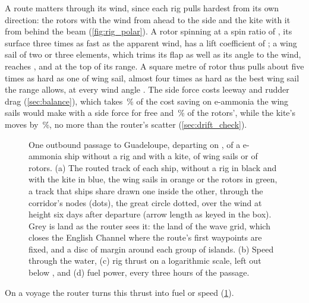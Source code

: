 A route matters through its wind, since each rig pulls hardest from its own direction: the rotors with the wind from ahead to the side and the kite with it from behind the beam (\cref{fig:rig_polar}). A rotor spinning at a spin ratio of , its surface three times as fast as the apparent wind, has a lift coefficient of ; a wing sail of two or three elements, which trims its flap as well as its angle to the wind, reaches , and  at the top of its range. A square metre of rotor thus pulls about five times as hard as one of wing sail, almost four times as hard as the best wing sail the range allows, at every wind angle . The side force costs leeway and rudder drag (\cref{sec:balance}), which takes \NumSideForceWings\,\% of the cost saving on e-ammonia the wing sails would make with a side force for free and \NumSideForceRotors\,\% of the rotors', while the kite's moves by \NumSideForceKite\,\%, no more than the router's scatter (\cref{sec:drift_check}).

\begin{figure}[tbp]
\centering
{}
\caption{ One outbound passage to Guadeloupe, departing on , of a  e-ammonia ship without a rig and with a  kite,  of wing sails or  of rotors. (a) The routed track of each ship, without a rig in black and with the kite in blue, the wing sails in orange or the rotors in green, a track that ships share drawn one inside the other, through the corridor's nodes (dots), the great circle dotted, over the wind at  height six days after departure (arrow length as keyed in the box). Grey is land as the router sees it: the land of the wave grid, which closes the English Channel where the route's first waypoints are fixed, and a disc of margin around each group of islands. (b) Speed through the water, (c) rig thrust on a logarithmic scale, left out below , and (d) fuel power, every three hours of the passage.}
\label{fig:passage}
\end{figure}

On a voyage the router turns this thrust into fuel or speed (\cref{fig:passage}).  

